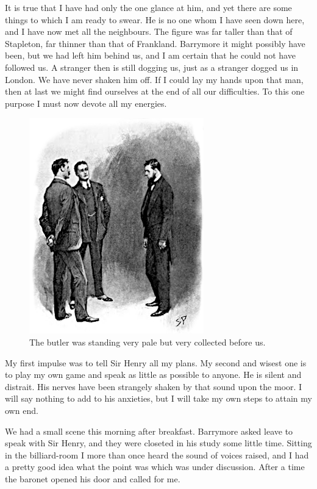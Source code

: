 \documentclass[paper=5.5in:8.5in,BCOR=7mm,twoside,DIV=calc,12pt,usegeometry,openany,chapterprefix,endperiod,headings=big]{scrbook} %
\begin{document}
It is true that I have had only the one glance at him, and yet there are some things to which I am ready to swear. He is no one whom I have seen down here, and I have now met all the neighbours. The figure was far taller than that of Stapleton, far thinner than that of Frankland. Barrymore it might possibly have been, but we had left him behind us, and I am certain that he could not have followed us. A stranger then is still dogging us, just as a stranger dogged us in London. We have never shaken him off. If I could lay my hands upon that man, then at last we might find ourselves at the end of all our difficulties. To this one purpose I must now devote all my energies.

\begin{figure}
\centering
\includegraphics[width=.7\linewidth]{10_butlerstand}
\caption{The butler was standing very pale but very collected before us.}
\end{figure}

My first impulse was to tell Sir Henry all my plans. My second and wisest one is to play my own game and speak as little as possible to anyone. He is silent and distrait. His nerves have been strangely shaken by that sound upon the moor. I will say nothing to add to his anxieties, but I will take my own steps to attain my own end.

We had a small scene this morning after breakfast. Barrymore asked leave to speak with Sir Henry, and they were closeted in his study some little time. Sitting in the billiard-room I more than once heard the sound of voices raised, and I had a pretty good idea what the point was which was under discussion. After a time the baronet opened his door and called for me.
\end{document}
